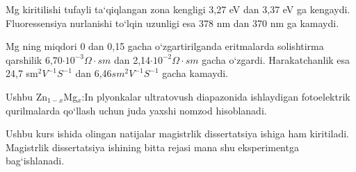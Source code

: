 \documentclass[14pt]{scrarticle}
\begin{document}
	Mg kiritilishi tufayli ta`qiqlangan zona kengligi 3,27 eV dan 3,37 eV ga kengaydi. Fluoressensiya nurlanishi to`lqin uzunligi esa 378 nm dan 370 nm ga kamaydi. 
	
	Mg ning miqdori 0 dan 0,15 gacha o`zgartirilganda eritmalarda solishtirma qarshilik 6,70$\cdot 10^{-3}\Omega\cdot sm$ dan 2,14$\cdot 10^{-2}\Omega\cdot sm$ gacha o`zgardi. Harakatchanlik esa 24,7 sm$^{2}V^{-1}S^{-1}$ dan 6,46$sm^{2}V^{-1}S^{-1}$ gacha kamaydi. 
	
	Ushbu Zn$_{1-x}$Mg$_{x}$:In plyonkalar ultratovush diapazonida ishlaydigan fotoelektrik qurilmalarda qo`llash uchun juda yaxshi nomzod hisoblanadi.
	
	Ushbu kurs ishida olingan natijalar magistrlik dissertatsiya ishiga ham kiritiladi. Magistrlik dissertatsiya ishining bitta rejasi mana shu eksperimentga bag`ishlanadi.
	
\end{document}
